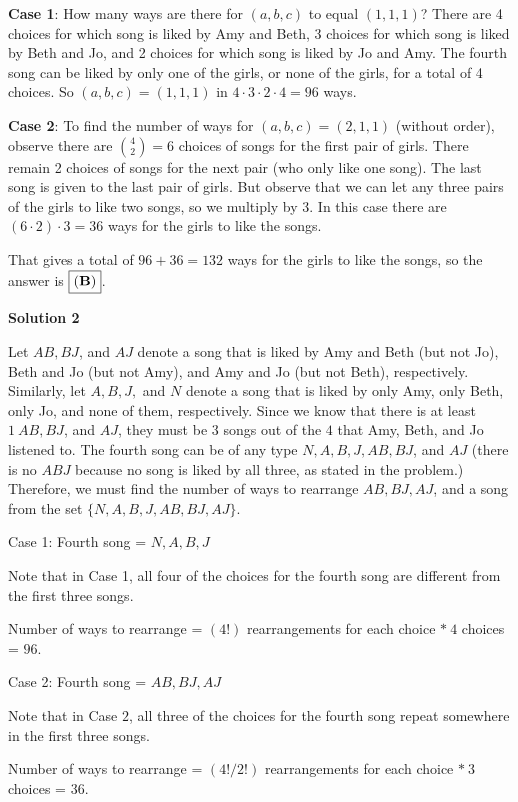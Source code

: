 \begin{enumerate}
 \textbf{Case 1}: How many ways are there for $(a,b,c)$ to equal $(1,1,1)$? There are 4 choices for which song is liked by Amy and Beth, 3 choices for which song is liked by Beth and Jo, and 2 choices for which song is liked by Jo and Amy. The fourth song can be liked by only one of the girls, or none of the girls, for a total of 4 choices. So $(a,b,c)=(1,1,1)$ in $4\cdot3\cdot2\cdot4 = 96$ ways.

 \textbf{Case 2}: To find the number of ways for $(a,b,c) = (2,1,1)$ (without order), observe there are $\binom{4}{2} = 6$ choices of songs for the first pair of girls. There remain 2 choices of songs for the next pair (who only like one song). The last song is given to the last pair of girls. But observe that we can let any three pairs of the girls to like two songs, so we multiply by 3. In this case there are $(6\cdot2)\cdot3=36$ ways for the girls to like the songs.

 That gives a total of $96 + 36 = 132$ ways for the girls to like the songs, so the answer is $\boxed{(\textrm{\textbf{B}})}$.

 



\textbf{Solution 2}

Let $AB, BJ$, and $AJ$ denote a song that is liked by Amy and Beth (but not Jo), Beth and Jo (but not Amy), and Amy and Jo (but not Beth), respectively. Similarly, let $A, B, J,$ and $N$ denote a song that is liked by only Amy, only Beth, only Jo, and none of them, respectively. Since we know that there is at least $1\: AB, BJ$, and $AJ$, they must be $3$ songs out of the $4$ that Amy, Beth, and Jo listened to. The fourth song can be of any type $N, A, B, J, AB, BJ$, and $AJ$ (there is no $ABJ$ because no song is liked by all three, as stated in the problem.) Therefore, we must find the number of ways to rearrange $AB, BJ, AJ$, and a song from the set $\{N, A, B, J, AB, BJ, AJ\}$.

 Case 1: Fourth song = $N, A, B, J$

 Note that in Case 1, all four of the choices for the fourth song are different from the first three songs.

 Number of ways to rearrange = $(4!)$ rearrangements for each choice $*\: 4$ choices = $96$.

 Case 2: Fourth song = $AB, BJ, AJ$

 Note that in Case $2$, all three of the choices for the fourth song repeat somewhere in the first three songs.

 Number of ways to rearrange = $(4!/2!)$ rearrangements for each choice $*\: 3$ choices = $36$.


\end{enumerate}

